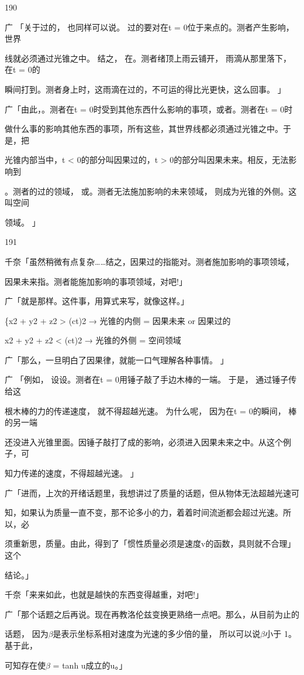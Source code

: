 190\par
广 「关于过的， 也同样可以说。 过的要对在t = 0位于来点的。测者产生影响， 世界\par
线就必须通过光锥之中。 结之， 在。测者绪顶上雨云铺开， 雨滴从那里落下， 在t = 0的\par
瞬间打到。测者身上时，这雨滴在过的，不可运的得比光更快，这么回事。 」\par
广「由此，。测者在t = 0时受到其他东西什么影响的事项，或者。测者在t = 0时\par
做什么事的影响其他东西的事项，所有这些，其世界线都必须通过光锥之中。于是，把\par
光锥内部当中，t < 0的部分叫因果过的，t > 0的部分叫因果未来。相反，无法影响到\par
。测者的过的领域， 或。测者无法施加影响的未来领域， 则成为光锥的外侧。这叫空间\par
领域。 」\par

191\par
千奈「虽然稍微有点复杂……结之，因果过的指能对。测者施加影响的事项领域，\par
因果未来指。测者能施加影响的事项领域，对吧!」\par
广「就是那样。这件事，用算式来写，就像这样。」\par
\{x2 + y2 + z2 > (ct)2 → 光锥的内侧 = 因果未来 or 因果过的\par
x2 + y2 + z2 < (ct)2 → 光锥的外侧 = 空间领域\par
广「那么，一旦明白了因果律，就能一口气理解各种事情。 」\par
广 「例如， 设设。测者在t = 0用锤子敲了手边木棒的一端。 于是， 通过锤子传给这\par
根木棒的力的传递速度， 就不得超越光速。 为什么呢， 因为在t = 0的瞬间， 棒的另一端\par
还没进入光锥里面。因锤子敲打了成的影响，必须进入因果未来之中。从这个例子，可\par
知力传递的速度，不得超越光速。 」\par
广「进而，上次的开绪话题里，我想讲过了质量的话题，但从物体无法超越光速可\par
知，如果认为质量一直不变，那不论多小的力，着着时间流逝都会超过光速。所以，必\par
须重新思，质量。由此，得到了「惯性质量必须是速度v的函数，具则就不合理」这个\par
结论。」\par
千奈「来来如此，也就是越快的东西变得越重，对吧!」\par
广「那个话题之后再说。现在再教洛伦兹变换更熟络一点吧。那么，从目前为止的\par
话题， 因为$\beta$是表示坐标系相对速度为光速的多少倍的量， 所以可以说$\beta$小于 1。 基于此，\par
可知存在使$\beta$ = tanh u成立的u。」\par

